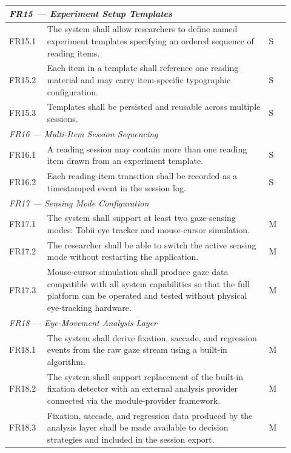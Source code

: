 \begin{longtable}{%
  p{0.12\linewidth}
  p{0.73\linewidth}
  p{0.07\linewidth}
}
\multicolumn{3}{l}{\textit{FR15 — Experiment Setup Templates}} \\
\midrule
FR15.1 & The system shall allow researchers to define named experiment
         templates specifying an ordered sequence of reading items. & S \\
FR15.2 & Each item in a template shall reference one reading material and
         may carry item-specific typographic configuration. & S \\
FR15.3 & Templates shall be persisted and reusable across multiple sessions. & S \\
\midrule

\multicolumn{3}{l}{\textit{FR16 — Multi-Item Session Sequencing}} \\
\midrule
FR16.1 & A reading session may contain more than one reading item drawn
         from an experiment template. & S \\
FR16.2 & Each reading-item transition shall be recorded as a timestamped
         event in the session log. & S \\
\midrule

\multicolumn{3}{l}{\textit{FR17 — Sensing Mode Configuration}} \\
\midrule
FR17.1 & The system shall support at least two gaze-sensing modes: Tobii
         eye tracker and mouse-cursor simulation. & M \\
FR17.2 & The researcher shall be able to switch the active sensing mode
         without restarting the application. & M \\
FR17.3 & Mouse-cursor simulation shall produce gaze data compatible with all
         system capabilities so that the full platform can be operated and
         tested without physical eye-tracking hardware. & M \\
\midrule

\multicolumn{3}{l}{\textit{FR18 — Eye-Movement Analysis Layer}} \\
\midrule
FR18.1 & The system shall derive fixation, saccade, and regression events
         from the raw gaze stream using a built-in algorithm. & M \\
FR18.2 & The system shall support replacement of the built-in fixation
         detector with an external analysis provider connected via the
         module-provider framework. & M \\
FR18.3 & Fixation, saccade, and regression data produced by the analysis
         layer shall be made available to decision strategies and included
         in the session export. & M \\
\midrule


\end{longtable}
